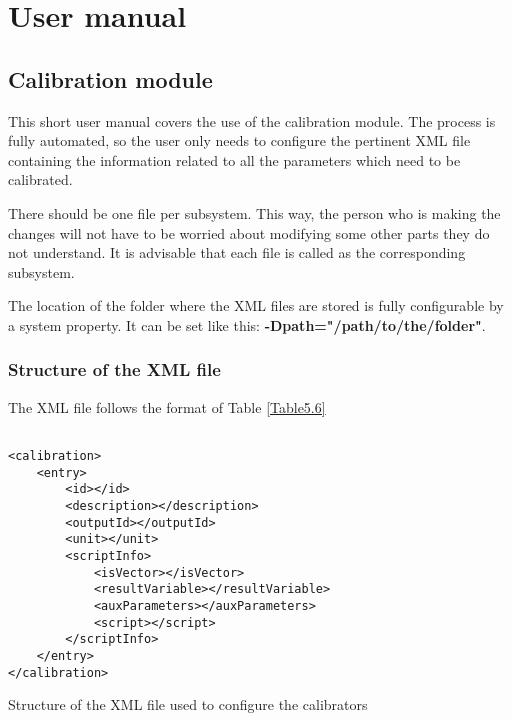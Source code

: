 \chapter{User manual}
\section{Calibration module}
This short user manual covers the use of the calibration module. The process is fully automated, so the user only needs to configure the pertinent XML file containing the information related to all the parameters which need to be calibrated.

There should be one file per subsystem. This way, the person who is making the changes will not have to be worried about modifying some other parts they do not understand. It is advisable that each file is called as the corresponding subsystem.


The location of the folder where the XML files are stored is fully configurable by a system property. It can be set like this: \textbf{-Dpath="/path/to/the/folder"}.
\pagebreak
\subsection{Structure of the XML file}

The XML file follows the format of Table \ref{Table5.6}
\begin{table}[H]
\lstset{language=XML}
\begin{lstlisting}

<calibration>
	<entry>
		<id></id>
		<description></description>
		<outputId></outputId>
		<unit></unit>
		<scriptInfo>
			<isVector></isVector>
			<resultVariable></resultVariable>
			<auxParameters></auxParameters>
			<script></script>
		</scriptInfo>
	</entry>
</calibration>
\end{lstlisting}
\caption{Structure of the XML file used to configure the calibrators}
\label{Table5.6}
\end{table}

